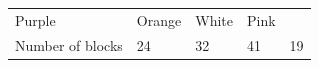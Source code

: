 \begin{enumerate}[noitemsep, label=\textbf{\arabic*}. ]
{\begin{tabular}[t]{|l|l|l|l|l|}
        Purple &
        Orange &
        White &
        Pink%
     \tabularnewline\cline{1-1}\cline{2-2}\cline{3-3}\cline{4-4}\cline{5-5}
        Number of
blocks &
        24 &
        32 &
        41 &
        19%
     \tabularnewline\cline{1-1}\cline{2-2}\cline{3-3}\cline{4-4}\cline{5-5}
    \end{tabular}} %
\end{enumerate}
